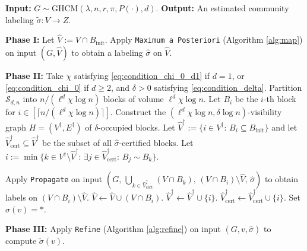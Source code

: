 \documentclass[11pt, a4paper]{amsart}
\newcommand{\1}{\mathbf{1}}
\theoremstyle{definition}
\theoremstyle{remark}
\theoremstyle{definition}
\begin{document}
\begingroup
\renewcommand{\thealgorithm}{B}
\begin{algorithm}[H]
    \caption{Block-based Exact Recovery}
    \label{alg:phase2_block}
    \begin{algorithmic}[1]
\Statex \textbf{Input:} $G\sim \mathrm{GHCM}(\lambda,n,r,\pi,P(\cdot),d)$.
\Statex \textbf{Output:} An estimated community labeling $\widetilde\sigma: V\to Z$.

\medskip
\State \textbf{Phase I:}
\State  Let $\hat V:= V \cap B_{\mathrm{init}}$. 
\State Apply \texttt{Maximum a Posteriori} (Algorithm \ref{alg:map}) on input $(G, \hat V)$ to obtain a labeling $\hat{\sigma}$ on $\hat V$.


\medskip
\State \textbf{Phase II:}
\State Take $\chi$ satisfying \eqref{eq:condition_chi_0_d1} if $d=1$, or \eqref{eq:condition_chi_0} if $d\geq 2$, and $\delta>0$ satisfying \eqref{eq:condition_delta}.
\State Partition $\mathcal S_{d,n}$ into $n / (\ell^d \chi \log n)$ blocks of volume $\ell^d\chi\log n$.
\State Let $B_i$ be the $i$-th block for $i \in [\lceil n/(\ell^d \chi \log n)\rceil]$.
\State Construct the $(\ell^d \chi \log n,\delta \log n)$-visibility graph $H=(V^\dagger,E^\dagger)$ of $\delta$-occupied blocks.
\State Let $\hat V^\dagger:=\{i \in V^\dagger:\,B_i \subseteq B_{\mathrm{init}} \}$ and let $\hat V_{\mathrm{cert}}^\dagger \subseteq \hat V^\dagger$ be the subset of all $\hat \sigma$-certified blocks.
\State Let $i:=\min \{k \in V^\dagger \setminus \hat V^\dagger:\,\exists j \in \hat V_{\mathrm{cert}}^\dagger:\,B_j \sim B_k\}$.

\State Apply \texttt{Propagate} on input
$(
G,\,
\bigcup_{k\in\hat V_{\mathrm{cert}}^\dagger}(V\cap B_k),\,
(V\cap B_i)\setminus\hat V,\,
\hat\sigma
)$
to obtain labels on $(V\cap B_i)\setminus\hat V$.
\State $\hat V\leftarrow\hat V\cup(V\cap B_i)$.
\State $\hat V^\dagger\leftarrow\hat V^\dagger\cup\{i\}$.
$\hat V_{\mathrm{cert}}^\dagger \leftarrow \hat V_{\mathrm{cert}}^\dagger  \cup \{i\}$.
 \EndIf
\EndWhile
{}
    \State Set $\hat{\sigma}(v) = *$.
\EndFor
\medskip

\State \textbf{Phase III:}
    \State Apply \texttt{Refine} (Algorithm \ref{alg:refine}) on input $(G, v, \hat{\sigma})$ to compute $\tilde{\sigma}(v)$.
\EndFor
    \end{algorithmic}
\end{algorithm} 
\endgroup
\end{document}
